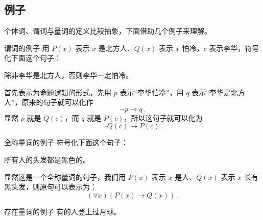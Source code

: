 \subsection{例子}
个体词、谓词与量词的定义比较抽象，下面借助几个例子来理解。

\begin{example}{谓词的例子}
用 $P(x)$ 表示 $x$ 是北方人、$Q(x)$ 表示 $x$ 怕冷，$c$ 表示李华，符号化下面这个句子：

除非李华是北方人，否则李华一定怕冷。
\end{example}
首先表示为命题逻辑的形式，先用 $p$ 表示“李华怕冷”，用 $q$ 表示“李华是北方人”，原来的句子就可以化作
\begin{equation}
\neg p \to  q ~.
\end{equation}
显然 $p$ 就是 $Q(c)$，而 $q$ 就是 $P(c)$，所以这句子就可以化为
\begin{equation}
\neg Q(c) \to  P(c) ~.
\end{equation}

\begin{example}{全称量词的例子}
符号化下面这个句子：

所有人的头发都是黑色的。
\end{example}
显然这是一个全称量词的句子，我们用 $P(x)$ 表示 $x$ 是人、$Q(x)$ 表示 $x$ 长有黑头发，则原句可以表示为：
\begin{equation}
(\forall x)(P(x) \to Q(x)) ~.
\end{equation}

\begin{example}{存在量词的例子}
有的人登上过月球。
\end{example}
